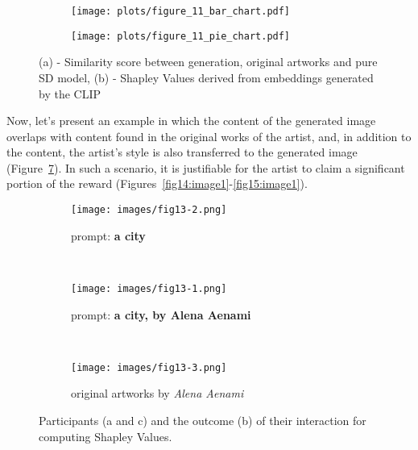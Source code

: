 \documentclass[12pt, letterpaper]{article}
\begin{document}
\begin{figure}[h]
  \centering
  \begin{subfigure}[b]{0.6\textwidth}
    \texttt{[image: plots/figure\_11\_bar\_chart.pdf]}
    \caption{}
        \label{fig11:image1}
  \end{subfigure}%
  \begin{subfigure}[b]{0.4\textwidth}
    \texttt{[image: plots/figure\_11\_pie\_chart.pdf]}
    \caption{}
        \label{fig11:image2}
  \end{subfigure}
 \captionsetup{justification=centering}
  \caption{(a) - Similarity score between generation, original artworks and pure SD model, (b) - Shapley Values derived from embeddings generated by the CLIP}
  \label{fig11}
\end{figure}

Now, let's present an example in which the content of the generated image overlaps with content found in the original works of the artist, and, in addition to the content, the artist's style is also transferred to the generated image (Figure~\ref{fig13:stacked_images}). In such a scenario, it is justifiable for the artist to claim a significant portion of the reward (Figures~\ref{fig14:image1}-\ref{fig15:image1}).

\begin{figure}[h]
    \centering
    
    \begin{subfigure}{\textwidth}
        \centering
        \texttt{[image: images/fig13-2.png]}
        \caption{prompt: \textbf{a city}}
        \label{fig13:sub1}
    \end{subfigure}
    \\
    
    \begin{subfigure}{\textwidth}
        \centering
        \texttt{[image: images/fig13-1.png]}
        \caption{prompt: \textbf{a city, by Alena Aenami}}
        \label{fig13:sub2}
    \end{subfigure}
    \\
   
    \begin{subfigure}{\textwidth}
        \centering
        \texttt{[image: images/fig13-3.png]}
        \caption{original artworks by \textit{Alena Aenami}}
        \label{fig13:sub3}
    \end{subfigure}    

    \caption{Participants (a and c) and the outcome (b) of their interaction for computing Shapley Values.}
    \label{fig13:stacked_images}
\end{figure}
\end{document}
